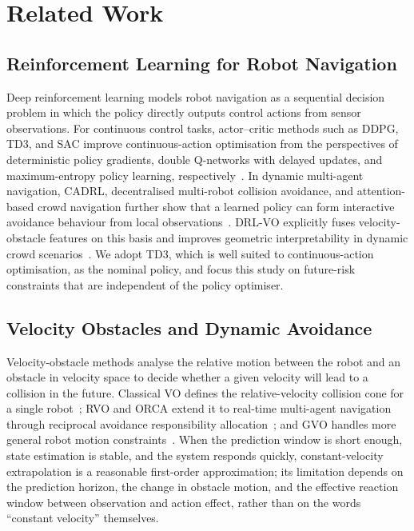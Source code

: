 \documentclass[10pt,a4paper,twocolumn]{article}
\begin{document}
\section{Related Work}

\subsection{Reinforcement Learning for Robot Navigation}

Deep reinforcement learning models robot navigation as a sequential decision problem in which the policy directly outputs control actions from sensor observations. For continuous control tasks, actor--critic methods such as DDPG, TD3, and SAC improve continuous-action optimisation from the perspectives of deterministic policy gradients, double Q-networks with delayed updates, and maximum-entropy policy learning, respectively~\cite{lillicrap2016ddpg,fujimoto2018td3,haarnoja2018sac}. In dynamic multi-agent navigation, CADRL, decentralised multi-robot collision avoidance, and attention-based crowd navigation further show that a learned policy can form interactive avoidance behaviour from local observations~\cite{chen2017cadrl,long2018decentralized,chen2019sarl,fan2020multirobot}. DRL-VO explicitly fuses velocity-obstacle features on this basis and improves geometric interpretability in dynamic crowd scenarios~\cite{xie2023drlvo}. We adopt TD3, which is well suited to continuous-action optimisation, as the nominal policy, and focus this study on future-risk constraints that are independent of the policy optimiser.

\subsection{Velocity Obstacles and Dynamic Avoidance}

Velocity-obstacle methods analyse the relative motion between the robot and an obstacle in velocity space to decide whether a given velocity will lead to a collision in the future. Classical VO defines the relative-velocity collision cone for a single robot~\cite{fiorini1998vo}; RVO and ORCA extend it to real-time multi-agent navigation through reciprocal avoidance responsibility allocation~\cite{vandenberg2008rvo,vandenberg2011orca}; and GVO handles more general robot motion constraints~\cite{wilkie2009gvo}. When the prediction window is short enough, state estimation is stable, and the system responds quickly, constant-velocity extrapolation is a reasonable first-order approximation; its limitation depends on the prediction horizon, the change in obstacle motion, and the effective reaction window between observation and action effect, rather than on the words ``constant velocity'' themselves.
\end{document}
